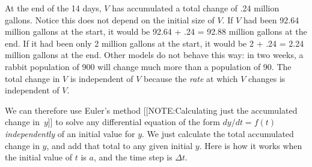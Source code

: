 At the end of the 14 days, $V$ has accumulated a total change of .24
million gallons.  Notice this does not depend on the initial size of
$V$.  If $V$ had been 92.64 million gallons at the start, it would be
92.64 + .24 = 92.88 million gallons at the end.  If it had been only 2
million gallons at the start, it would be 2 + .24 = 2.24 million
gallons at the end.  Other models do not behave this way: in two
weeks, a rabbit population of 900 will change much more than a
population of 90.  The total change in $V$ is independent of $V$
because the {\em rate\/} at which $V$ changes is independent of $V$.

\enlargethispage*{40pt}
We can therefore use Euler's method 
[[NOTE:Calculating just  the accumulated  change in~$y$]]
to solve any differential equation of the form $dy/dt = f(t)$ {\em
  independently\/} of an initial value for $y$.  We just calculate the
total accumulated change in $y$, and add that total to any given
initial $y$.  Here is how it works when the initial value of $t$ is
$a$, and the time step is $\Delta t$.  \addtolength{\arraycolsep}{6pt}
